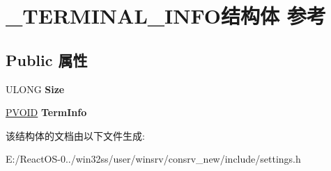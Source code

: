 \hypertarget{struct___t_e_r_m_i_n_a_l___i_n_f_o}{}\section{\+\_\+\+T\+E\+R\+M\+I\+N\+A\+L\+\_\+\+I\+N\+F\+O结构体 参考}
\label{struct___t_e_r_m_i_n_a_l___i_n_f_o}
\subsection*{Public 属性}
\begin{DoxyCompactItemize}
\item 
\mbox{\label{struct___t_e_r_m_i_n_a_l___i_n_f_o_a5f6f8cf607a1fd1f49a81deda29fcb84}} 
U\+L\+O\+NG {\bfseries Size}
\item 
\mbox{\label{struct___t_e_r_m_i_n_a_l___i_n_f_o_a2d558e070a68511ea67ba08c687534e0}} 
\hyperlink{interfacevoid}{P\+V\+O\+ID} {\bfseries Term\+Info}
\end{DoxyCompactItemize}


该结构体的文档由以下文件生成\+:\begin{DoxyCompactItemize}
\item 
E\+:/\+React\+O\+S-\/0../win32ss/user/winsrv/consrv\+\_\+new/include/settings.\+h\end{DoxyCompactItemize}
